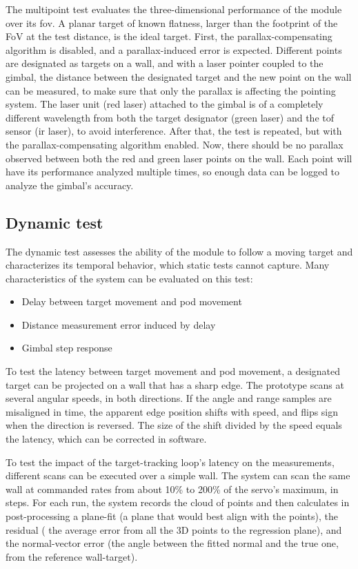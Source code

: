 The multipoint test evaluates the three-dimensional performance of the module
over its \gls{fov}. A planar target of known flatness, larger than
the footprint of the FoV at the test distance, is the ideal target.
First, the parallax-compensating algorithm is disabled, and a parallax-induced
error is expected. Different points are designated as targets on a wall, and
with a laser pointer coupled to the gimbal, the distance between the designated
target and the new point on the wall can be measured, to make sure that only
the parallax is affecting the pointing system.
The laser unit (red laser) attached to the gimbal is of a completely different
wavelength from both the target designator (green laser) and the \gls{tof}
sensor (\gls{ir} laser), to avoid interference.
After that, the test is repeated, but with the parallax-compensating algorithm
enabled. Now, there should be no parallax observed between both the red and green
laser points on the wall. Each point will have its performance analyzed
multiple times, so enough data can be logged to analyze the gimbal's accuracy.

\subsection{Dynamic test}

The dynamic test assesses the ability of the module to follow a moving target
and characterizes its temporal behavior, which static tests cannot capture.
Many characteristics of the system can be evaluated on this test:

\begin{itemize}
  \item Delay between target movement and pod movement
  \item Distance measurement error induced by delay
  \item Gimbal step response
\end{itemize}

To test the latency between target movement and pod movement,
a designated target can be projected on a wall that has a sharp edge.
The prototype scans at several angular speeds, in both directions. If the angle
and range samples are misaligned in time, the apparent edge position shifts with
speed, and flips sign when the direction is reversed. The size of the shift
divided by the speed equals the latency, which can be corrected in software.

To test the impact of the target-tracking loop's latency on the measurements,
different scans can be executed over a simple wall. The system can scan the same
wall at commanded rates from about 10\% to 200\% of the servo's maximum, in steps.
For each run, the system records the cloud of points and then calculates
in post-processing a plane-fit
(a plane that would best align with the points), the residual (%
the average error from all the 3D points to the regression plane), and
the normal-vector error (the angle between the fitted normal and the true one,
from the reference wall-target).


